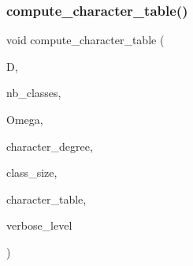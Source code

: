 \mbox{\label{burnside_8_c_a594d6fa815b4bbd4051678525d259daa}} 
\subsubsection{\texorpdfstring{compute\+\_\+character\+\_\+table()}{compute\_character\_table()}}
{\footnotesize\ttfamily void compute\+\_\+character\+\_\+table (\begin{DoxyParamCaption}\item[{\mbox{\hyperlink{classa__domain}{a\+\_\+domain}} $\ast$}]{D,  }\item[{\mbox{\hyperlink{galois_8h_a09fddde158a3a20bd2dcadb609de11dc}{I\+NT}}}]{nb\+\_\+classes,  }\item[{\mbox{\hyperlink{galois_8h_a09fddde158a3a20bd2dcadb609de11dc}{I\+NT}} $\ast$}]{Omega,  }\item[{\mbox{\hyperlink{galois_8h_a09fddde158a3a20bd2dcadb609de11dc}{I\+NT}} $\ast$}]{character\+\_\+degree,  }\item[{\mbox{\hyperlink{galois_8h_a09fddde158a3a20bd2dcadb609de11dc}{I\+NT}} $\ast$}]{class\+\_\+size,  }\item[{\mbox{\hyperlink{galois_8h_a09fddde158a3a20bd2dcadb609de11dc}{I\+NT}} $\ast$\&}]{character\+\_\+table,  }\item[{\mbox{\hyperlink{galois_8h_a09fddde158a3a20bd2dcadb609de11dc}{I\+NT}}}]{verbose\+\_\+level }\end{DoxyParamCaption})}

\mbox{\label{burnside_8_c_aab8b0528e91c0ef087c49a16ec0d3d8e}} 
